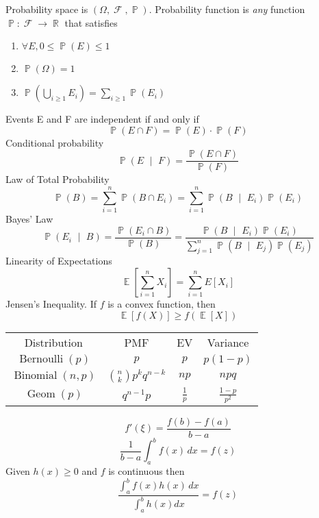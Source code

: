 \documentclass[10pt,landscape,a4paper]{article}
\newenvironment{topic}[1]
{\begin{mdframed}[
    linecolor=black,
    frametitle=#1,
    frametitlebackgroundcolor=black!5,
  ]}
{\end{mdframed}}
\DeclareMathOperator{\prob}{\mathbb{P}}
\DeclareMathOperator{\E}{\mathbb{E}}
\DeclareMathOperator{\F}{\mathcal{F}}
\DeclareMathOperator{\R}{\mathbb{R}}
\DeclareMathOperator{\given}{\: \vert \:}
\DeclareMathOperator{\bernoulli}{Bernoulli}
\DeclareMathOperator{\binomial}{Binomial}
\DeclareMathOperator{\geometric}{Geom}
\newcommand{\dx}[1][x]{\,d#1}
\newcommand{\abint}{\int_a^b}
\newcommand{\summation}[1][i = 1]{\sum_{#1}^{n}}
\begin{document}
\thispagestyle{empty}

\begin{multicols}{3}

  \begin{topic}{Probability}
    Probability space is $(\Omega, \F, \prob)$.
    Probability function is \emph{any} function $\prob : \F \rightarrow \R$
    that satisfies
    \begin{enumerate}
      \item $\forall E, 0 \leq \prob(E) \leq 1$
      \item $\prob(\Omega) = 1$
      \item $\prob \left( \bigcup\limits_{i \geq 1} E_i \right)
        = \sum\limits_{i \geq 1} \prob(E_i)$
    \end{enumerate}
    Events E and F are independent if and only if
    \[
      \prob(E \cap F) = \prob(E) \cdot \prob(F)
    \]
    Conditional probability
    \[
      \prob(E \given F) = \frac{\prob(E \cap F)}{\prob(F)}
    \]
    Law of Total Probability
    \[
      \prob(B)
      = \summation \prob(B \cap E_i)
      = \summation \prob(B \given E_i) \prob(E_i)
    \]
    Bayes' Law
    \[
      \prob(E_i \given B)
      = \frac{\prob(E_i \cap B)}{\prob(B)}
      = \frac{\prob(B \given E_i) \prob(E_i)}
      {\summation[j = 1] \prob(B \given E_j) \prob(E_j)}
    \]
    Linearity of Expectations
    \[
      \E \left[ \sum_{i = 1}^n X_i \right]
      = \sum_{i = 1}^n E[X_i]
    \]
    Jensen's Inequality. If $f$ is a convex function, then
    \[
      \E[ f(X) ] \geq f( \E[X] )
    \]
  \end{topic}

  \begin{topic}{Distributions}
    \begin{tabular}{cccc}
      Distribution & PMF & EV & Variance \\
      $\bernoulli(p)$ & $p$ & $p$ & $p(1-p)$ \\
      $\binomial(n,p)$ & $\binom{n}{k} p^k q^{n-k}$ & $np$ & $npq$ \\
      $\geometric(p)$ & $q^{n-1}p$ & $\frac{1}{p}$ & $\frac{1-p}{p^2}$ \\
    \end{tabular}
  \end{topic}

  \begin{topic}{Intermediate value}{
      \[
        f'(\xi) = \frac{f(b) - f(a)}{b - a}
      \]
      \[
        \frac{1}{b - a} \abint f(x) \dx = f(z)
      \]
      Given $h(x) \geq 0$ and $f$ is continuous then
      \[
        \frac{\abint f(x)h(x) \dx}{ \abint h(x) dx}
        = f(z)
      \]
  }\end{topic}


\end{multicols}
\end{document}
